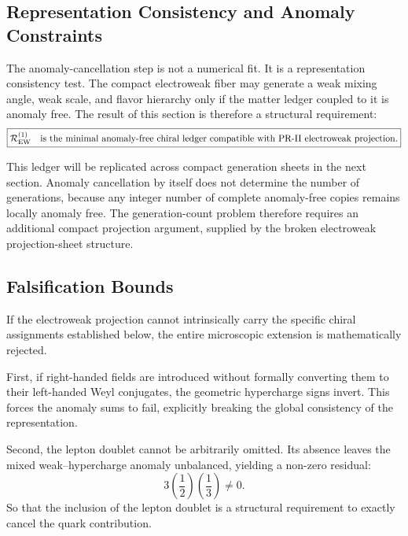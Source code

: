 \documentclass[11pt]{article}
\begin{document}
\subsection{Representation Consistency and Anomaly Constraints}
\label{sec:pr2_anomaly_structural_role}

The anomaly-cancellation step is not a numerical fit. 
It is a representation consistency test. 
The compact electroweak fiber may generate a weak mixing angle, weak scale, and flavor hierarchy only if the matter ledger coupled to it is anomaly free. 
The result of this section is therefore a structural requirement:
\begin{equation}
\boxed{
\mathcal R_{\rm EW}^{(1)}
\quad
\text{is the minimal anomaly-free chiral ledger compatible with PR-II electroweak projection.}
}
\end{equation}

This ledger will be replicated across compact generation sheets in the next section. 
Anomaly cancellation by itself does not determine the number of generations, because any integer number of complete anomaly-free copies remains locally anomaly free. 
The generation-count problem therefore requires an additional compact projection argument, supplied by the broken electroweak projection-sheet structure.

\subsection{Falsification Bounds}
\label{sec:pr2_anomaly_negative_controls}

If the electroweak projection cannot intrinsically carry the specific chiral assignments established below, the entire microscopic extension is mathematically rejected.

First, if right-handed fields are introduced without formally converting them to their left-handed Weyl conjugates, the geometric hypercharge signs invert. This forces the anomaly sums to fail, explicitly breaking the global consistency of the representation. 

Second, the lepton doublet cannot be arbitrarily omitted. Its absence leaves the mixed weak--hypercharge anomaly unbalanced, yielding a non-zero residual:
\begin{equation}
3\left(\frac12\right)\left(\frac13\right)
\neq0.
\end{equation}
So that the inclusion of the lepton doublet is a structural requirement to exactly cancel the quark contribution.
\end{document}

